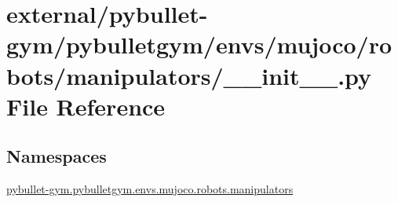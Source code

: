 \hypertarget{external_2pybullet-gym_2pybulletgym_2envs_2mujoco_2robots_2manipulators_2____init_____8py}{}\section{external/pybullet-\/gym/pybulletgym/envs/mujoco/robots/manipulators/\+\_\+\+\_\+init\+\_\+\+\_\+.py File Reference}
\label{external_2pybullet-gym_2pybulletgym_2envs_2mujoco_2robots_2manipulators_2____init_____8py}
\subsection*{Namespaces}
\begin{DoxyCompactItemize}
\item 
 \hyperlink{namespacepybullet-gym_1_1pybulletgym_1_1envs_1_1mujoco_1_1robots_1_1manipulators}{pybullet-\/gym.\+pybulletgym.\+envs.\+mujoco.\+robots.\+manipulators}
\end{DoxyCompactItemize}
